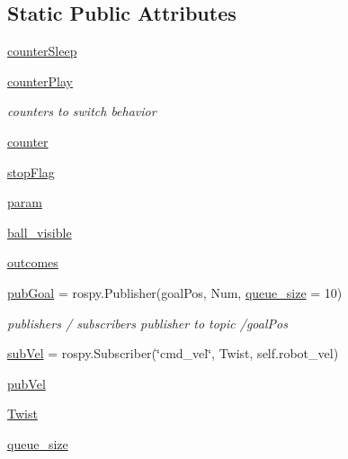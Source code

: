 \subsection*{Static Public Attributes}
\begin{DoxyCompactItemize}
\item 
\hyperlink{classstate__machine_1_1Normal_a4b32c1a56ad043f9913b9b3068aafaa1}{counter\+Sleep}
\item 
\hyperlink{classstate__machine_1_1Normal_ad9306b3db821d9634339a20308e48a25}{counter\+Play}
\begin{DoxyCompactList}\small\item\em counters to switch behavior \end{DoxyCompactList}\item 
\hyperlink{classstate__machine_1_1Normal_ad631fe332b431c0001682701dde8dbed}{counter}
\item 
\hyperlink{classstate__machine_1_1Normal_a27eca8cdd2bee790ad3eecd42c23e3b5}{stop\+Flag}
\item 
\hyperlink{classstate__machine_1_1Normal_ad676a7bddfcb08e695d05338b57989f9}{param}
\item 
\hyperlink{classstate__machine_1_1Normal_aa7f6732a154ed8e53353598c2278cd49}{ball\+\_\+visible}
\item 
\hyperlink{classstate__machine_1_1Normal_ab6d144a3dda6248e1d2f30f9abe9d609}{outcomes}
\item 
\hyperlink{classstate__machine_1_1Normal_abf3086095a488112b289e23941a57809}{pub\+Goal} = rospy.\+Publisher(\textquotesingle{}goal\+Pos\textquotesingle{}, Num, \hyperlink{classstate__machine_1_1Normal_ae4b7ade70a0e23f0dd8738aaca0b4e4d}{queue\+\_\+size} = 10)
\begin{DoxyCompactList}\small\item\em publishers / subscribers publisher to topic /goal\+Pos \end{DoxyCompactList}\item 
\hyperlink{classstate__machine_1_1Normal_a12658175f11bf60d621652d845da5d31}{sub\+Vel} = rospy.\+Subscriber(\char`\"{}cmd\+\_\+vel\char`\"{}, Twist, self.\+robot\+\_\+vel)
\item 
\hyperlink{classstate__machine_1_1Normal_a8f98c449693c58319157bc51e2621157}{pub\+Vel}
\item 
\hyperlink{classstate__machine_1_1Normal_a6f6f347ff2c917d80cdb28f42e7cfd47}{Twist}
\item 
\hyperlink{classstate__machine_1_1Normal_ae4b7ade70a0e23f0dd8738aaca0b4e4d}{queue\+\_\+size}
\item 

\end{DoxyCompactItemize}
